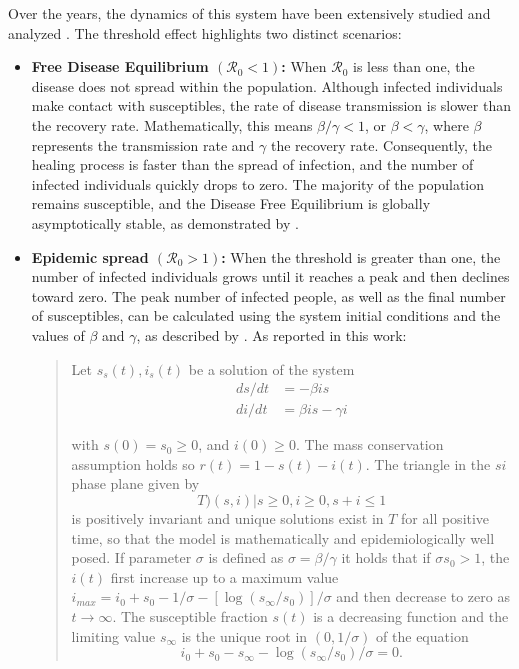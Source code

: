 Over the years, the dynamics of this system have been extensively studied and analyzed \cite{Breda_2012, akinboro2014numerical, Jard_n_Kojakhmetov_2021, Ledder_2023, Okabe_2020, Prodanov_2022, Xu_2014, Turkyilmazoglu_2021}. The threshold effect highlights two distinct scenarios:
\begin{itemize}
	\item \textbf{Free Disease Equilibrium $(\mathcal{R}_0 < 1)$:} When $\mathcal{R}_0$ is less than one, the disease does not spread within the population. Although infected individuals make contact with susceptibles, the rate of disease transmission is slower than the recovery rate. Mathematically, this means $\beta / \gamma < 1$, or $\beta < \gamma$, where $\beta$ represents the transmission rate and $\gamma$ the recovery rate. Consequently, the healing process is faster than the spread of infection, and the number of infected individuals quickly drops to zero. The majority of the population remains susceptible, and the Disease Free Equilibrium is globally asymptotically stable, as demonstrated by \cite{Hernandez_Vargas_2022}.
	\item \textbf{Epidemic spread $(\mathcal{R}_0 > 1)$:}     When the threshold is greater than one, the number of infected individuals grows until it reaches a peak and then declines toward zero. The peak number of infected people, as well as the final number of susceptibles, can be calculated using the system initial conditions and the values of $\beta$ and $\gamma$, as described by \cite{Hethcote_2000}. 
	As reported in this work:
	\begin{quotation}\small
	Let $s_s(t),i_s(t)$ be a solution of the system 
	\begin{equation}
		\begin{split} 
			ds/dt &= -\beta i s\\
			di/dt &= \beta i s - \gamma i	
		\end{split}
	\end{equation}

	with $s(0) = s_0 \ge 0$, and $i(0) \ge 0$. The mass conservation assumption holds so $r(t) = 1-s(t)-i(t)$. The triangle in the $si$ phase plane given by 
	\[T ) {(s,i)|s \ge 0, i\ge 0, s+i \le 1 }\]
	is positively invariant and unique solutions exist in $T$ for all positive time, so that the
	model is mathematically and epidemiologically well posed.
	If parameter $\sigma$ is defined as $\sigma=\beta/\gamma$ it holds that if $\sigma s_0 >1$, the $i(t)$ first increase up to a maximum value $i_{max} = i_0 + s_0 - 1/\sigma - [\log(s_\infty/s_0)]/\sigma $ and then decrease to zero as $t \rightarrow \infty$. The susceptible fraction $s(t)$ is a decreasing function and the limiting value $s_\infty$ is the
	unique root in $(0, 1/\sigma)$ of the equation
	\[
	i_0 + s_0 -s_\infty - \log(s_\infty/s_0)/\sigma = 0. 
	\]		
	\end{quotation}
	

\end{itemize}
